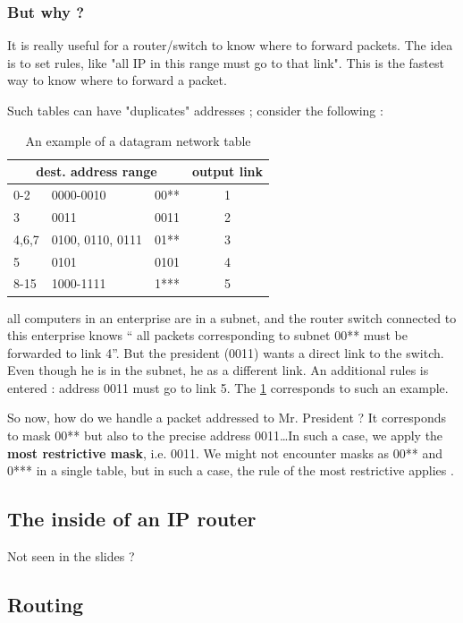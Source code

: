 \documentclass[12pt,a4paper]{article}
\begin{document}
\subsubsection{But why ?}
It is really useful for a router/switch to know where to forward packets. The idea is to set rules, like "all IP in this range must go to that link". This is the fastest way to know where to forward a packet.

Such tables can have "duplicates" addresses ; consider the following :
\begin{table}
\centering
\begin{tabular}{|l l l |c|}
\hline
\multicolumn{3}{|c|}{dest. address range} & output link\\
\hline
0-2 & 0000-0010 & 00** & 1\\
3 & 0011 & 0011 & 2\\
4,6,7 & 0100, 0110, 0111 & 01** & 3\\
5 & 0101 & 0101 & 4\\
8-15 & 1000-1111 & 1*** & 5\\
\hline
\end{tabular}
\caption{An example of a datagram network table}
\label{tab: datagram network}
\end{table}
 all computers in an enterprise are in a subnet, and the router switch connected to this enterprise knows `` all packets corresponding to subnet 00** must be forwarded to link 4''. But the president (0011) wants a direct link to the switch. Even though he is in the subnet, he as a different link. An additional rules is entered : address 0011 must go to link 5. The \ref{tab: datagram network} corresponds to such an example.
 
So now, how do we handle a packet addressed to Mr. President ? It corresponds to mask 00** but also to the precise address 0011\ldots In such a case, we apply the \textbf{most restrictive mask}, i.e. 0011. We might not encounter masks as 00** and 0*** in a single table, but in such a case, the rule of the most restrictive applies .
\subsection{The inside of an IP router}
Not seen in the slides ?


\subsection*{Routing}
\end{document}
